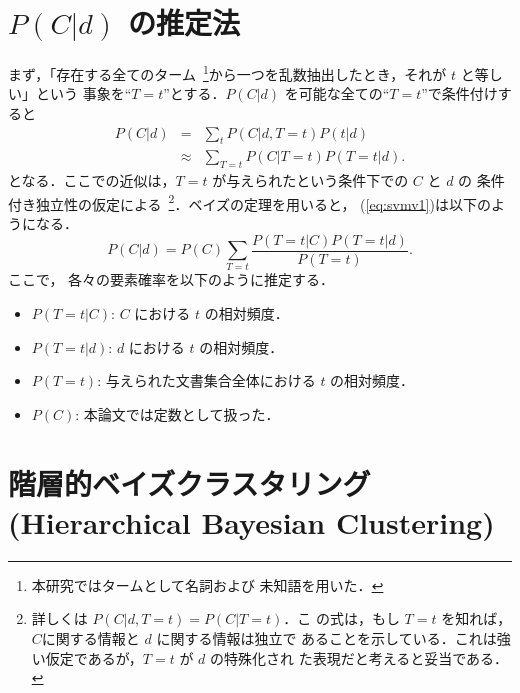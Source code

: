 \vspace{-3mm}
\appendix

\section{$P(C|d)$ の推定法}
\label{app:SVMV}

まず，「存在する全てのターム~\footnote{本研究ではタームとして名詞および
未知語を用いた．}から一つを乱数抽出したとき，それが $t$ と等しい」という
事象を``$T=t$''とする．$P(C|d)$ を可能な全ての``$T=t$''で条件付けすると
\begin{eqnarray}
  P(C|d)
    &=& \sum_{t} P(C|d,T=t) P(t|d)\nonumber\\
    &\approx& \sum_{T=t} P(C|T=t) P(T=t|d).\label{eq:svmv1}
\end{eqnarray}
となる．ここでの近似は，$T=t$ が与えられたという条件下での $C$ と $d$ の
条件付き独立性の仮定による~\footnote{詳しくは $P(C|d,T=t)=P(C|T=t)$．こ
の式は，もし $T=t$ を知れば，$C$に関する情報と $d$ に関する情報は独立で
あることを示している．これは強い仮定であるが，$T=t$ が $d$ の特殊化され
た表現だと考えると妥当である．}．ベイズの定理を用いると，
(\ref{eq:svmv1})は以下のようになる．
\begin{equation}
  P(C|d) = P(C) \sum_{T=t} \frac{P(T=t|C) P(T=t|d)}{P(T=t)}.
    \label{eq:svmv2}
\end{equation}
ここで，
各々の要素確率を以下のように推定する．
\begin{itemize}
  \item $P(T=t|C)$: $C$ における $t$ の相対頻度．
  \item $P(T=t|d)$: $d$ における $t$ の相対頻度．
  \item $P(T=t)$: 与えられた文書集合全体における $t$ の相対頻度．
  \item $P(C)$: 本論文では定数として扱った．
\end{itemize}

\section{階層的ベイズクラスタリング(Hierarchical Bayesian Clustering)}
\label{app:hbc}

